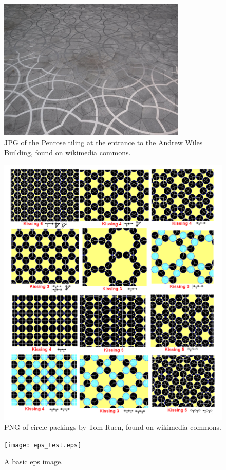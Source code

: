 \documentclass{article}
\begin{document}
\begin{figure}
\includegraphics[width=0.8\textwidth]{Penrose_tiling_at_Oxford_Mathematical_Institute_small.jpg}
\caption{JPG of the Penrose tiling at the entrance to the Andrew Wiles Building, found on wikimedia commons.}
\end{figure}
\begin{figure}
\includegraphics[scale=2]{Uniform_tiling_circle_packings.png}
\caption{PNG of circle packings by Tom Ruen, found on wikimedia commons.}
\end{figure}
\begin{figure}
\texttt{[image: eps\_test.eps]}
\caption{A basic eps image.}
\end{figure}
\end{document}
